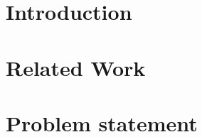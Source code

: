 \documentclass{article}
\begin{document}
\begin{multicols}{2}
\begin{abstract}
\noindent \blindtext
\end{abstract}
\section{Introduction}
\blindtext[5]

\section{Related Work}
\blindtext[5]

\section{Problem statement}

\end{multicols}
\end{document}
